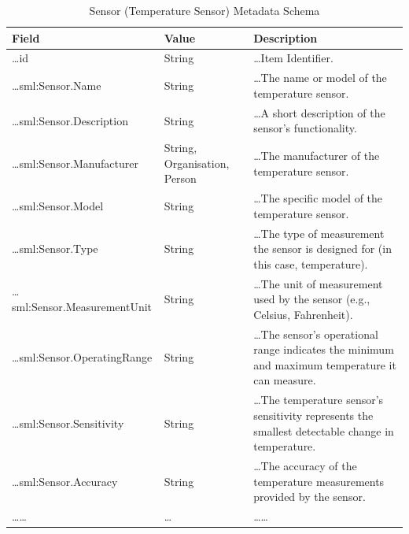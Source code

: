 \begin{longtable}{|p{}|p{}|p{}|}
    \caption{Sensor (Temperature Sensor) Metadata Schema} \label{tab:c4-temperature-sensor} \\
    \hline
    \textbf{Field} & \textbf{Value} & \textbf{Description} \\
    \hline

    \scriptsize …id                                    & \scriptsize String                         & \scriptsize …Item Identifier. \\
    \hline
    \scriptsize …sml:Sensor.Name                       & \scriptsize String                         & \scriptsize …The name or model of the temperature sensor. \\
    \hline
    \scriptsize …sml:Sensor.Description                & \scriptsize String                         & \scriptsize …A short description of the sensor’s functionality. \\
    \hline
    \scriptsize …sml:Sensor.Manufacturer               & \scriptsize String, \textcolor{uniudColor3}{Organisation}, \textcolor{uniudColor3}{Person}     & \scriptsize …The manufacturer of the temperature sensor. \\
    \hline
    \scriptsize …sml:Sensor.Model                      & \scriptsize String                         & \scriptsize …The specific model of the temperature sensor. \\
    \hline
    \scriptsize …sml:Sensor.Type                       & \scriptsize String                         & \scriptsize …The type of measurement the sensor is designed for (in this case, temperature). \\
    \hline
    \scriptsize …sml:Sensor.MeasurementUnit            & \scriptsize String                         & \scriptsize …The unit of measurement used by the sensor (e.g., Celsius, Fahrenheit). \\
    \hline
    \scriptsize …sml:Sensor.OperatingRange             & \scriptsize String                         & \scriptsize …The sensor's operational range indicates the minimum and maximum temperature it can measure. \\
    \hline
    \scriptsize …sml:Sensor.Sensitivity                & \scriptsize String                         & \scriptsize …The temperature sensor's sensitivity represents the smallest detectable change in temperature. \\
    \hline
    \scriptsize …sml:Sensor.Accuracy                   & \scriptsize String                         & \scriptsize …The accuracy of the temperature measurements provided by the sensor. \\
    \hline
    \scriptsize ……                                     & \scriptsize …                              & \scriptsize …… \\
    \hline

\end{longtable}

